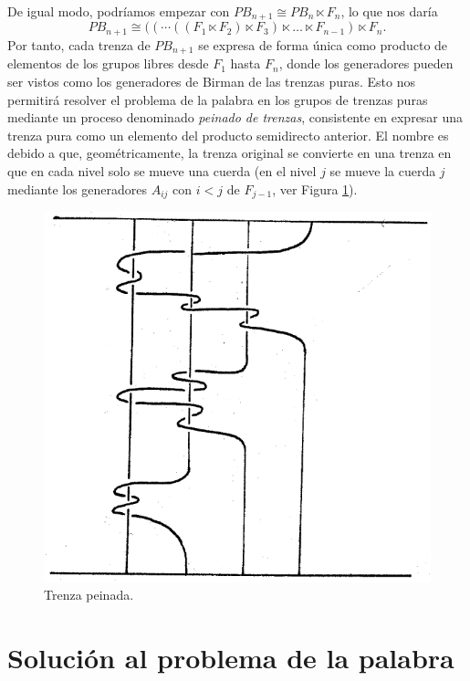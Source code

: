 \documentclass[TFG.tex]{subfiles}
\begin{document}
De igual modo, podríamos empezar con $PB_{n+1}\cong PB_n\ltimes F_n$, lo que nos daría
$$PB_{n+1}\cong ((\cdots ((F_1\ltimes F_2)\ltimes F_3)\ltimes\dots\ltimes F_{n-1})\ltimes F_n.$$
Por tanto, cada trenza de $PB_{n+1}$ se expresa de forma única como producto de elementos de los grupos libres desde $F_1$ hasta $F_n$, donde los generadores pueden ser vistos como los generadores de Birman de las trenzas puras. Esto nos permitirá resolver el problema de la palabra en los grupos de trenzas puras mediante un proceso denominado \emph{peinado de trenzas}, consistente en expresar una trenza pura como un elemento del producto semidirecto anterior. El nombre es debido a que, geométricamente, la trenza original se convierte en una trenza en que en cada nivel solo se mueve una cuerda (en el nivel $j$ se mueve la cuerda $j$ mediante los generadores $A_{ij}$ con $i<j$ de $F_{j-1}$, ver Figura \ref{peinada}).


\begin{figure}[h!]
\begin{turn}{1.5}
\includegraphics[scale=0.4]{Imagenes/peinado}
\end{turn}
\caption{Trenza peinada.}\label{peinada}
\end{figure}


\section{Solución al problema de la palabra}\label{simples}
\end{document}
